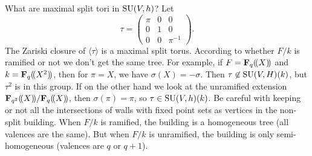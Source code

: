 What are maximal split tori in $\operatorname{SU}(V,h)$? Let 
\[
  \tau=\begin{pmatrix} \pi & 0 & 0 \\ 0 & 1 & 0 \\ 0 & 0 & \pi^{-1} \end{pmatrix}. 
\]
The Zariski closure of $\langle\tau\rangle$ is a maximal split torus. 
According to whether $F/k$ is ramified or not we don't get the same tree. 
For example, if $F=\mathbf{F}_q(\! ( X )\! )$ and $k=\mathbf{F}_q(\! ( X^2 )\! )$, then for 
$\pi=X$, we have $\sigma(X)=-\sigma$. Then 
$\tau\not\in \operatorname{SU}(V,H)(k)$, but $\tau^2$ is in this group. 
If on the other hand we look at the unramified extension 
$\mathbf{F}_{q^2}(\! ( X )\! )/\mathbf{F}_q(\! ( X )\! )$, then $\sigma(\pi)=\pi$, so 
$\tau\in \operatorname{SU}(V,h)(k)$. 
Be careful with keeping or not all the intersections of walls with fixed point 
sets as vertices in the non-split building. When $F/k$ is ramified, 
the building is a homogeneous tree (all valences are the same). But when 
$F/k$ is unramified, the building is only semi-homogeneous (valences 
are $q$ or $q+1$). 




